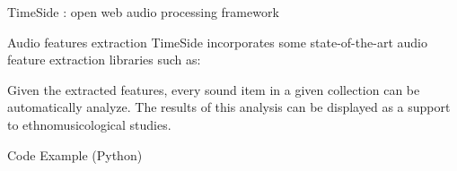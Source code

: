 \documentclass[final, hyperref, table]{beamer}
\begin{document}
\begin{frame}[containsverbatim]{}
\begin{columns}[T]
\begin{column}[T]{.49\linewidth}
\begin{block}{TimeSide : open web audio processing framework}
\begin{beamerboxesrounded}%
       [shadow=true]%
       {Audio features extraction}
  TimeSide incorporates some state-of-the-art audio feature extraction
  libraries such as:


  Given the extracted features, every sound item in a given collection
  can be automatically analyze. The results of this analysis can be
  displayed as a support to ethnomusicological studies. 
\end{beamerboxesrounded}






\end{block}

\begin{block}{Code Example (Python)}
\begin{columns}[T]
  \begin{column}[T]{0.6\linewidth}
    
  \end{column}
 

\end{columns}
\end{block}
\end{column}
\end{columns}
\end{frame}
\end{document}
